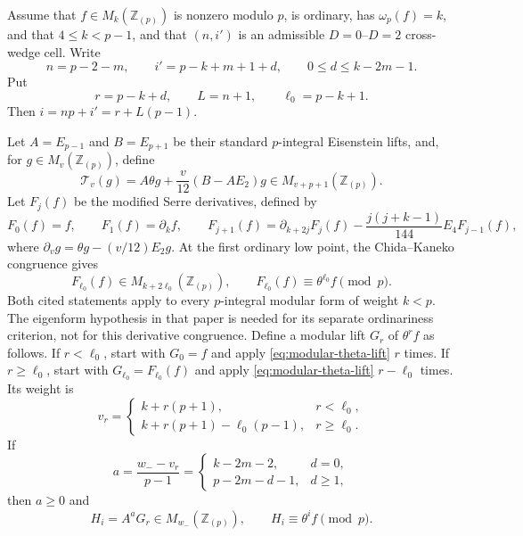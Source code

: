 \begin{theorem}
\label{thm:explicit-periodic-first-jet}
Assume that $f\in M_k(\mathbb Z_{(p)})$ is nonzero modulo $p$, is ordinary,
has $\omega_p(f)=k$, and that
$4\leq k<p-1$, and that $(n,i')$ is an admissible $D=0$--$D=2$
cross-wedge cell.  Write
\[
 n=p-2-m,
 \qquad
 i'=p-k+m+1+d,
 \qquad
 0\leq d\leq k-2m-1.
\]
Put
\[
 r=p-k+d,
 \qquad L=n+1,
 \qquad \ell_0=p-k+1.
\]
Then $i=np+i'=r+L(p-1)$.

Let $A=E_{p-1}$ and $B=E_{p+1}$ be their standard
$p$-integral Eisenstein lifts, and, for $g\in M_v(\mathbb Z_{(p)})$,
define
\begin{equation}\label{eq:modular-theta-lift}
 \mathcal T_v(g)
 =A\theta g+\frac{v}{12}(B-AE_2)g
 \in M_{v+p+1}(\mathbb Z_{(p)}).
\end{equation}
Let $F_j(f)$ be the modified Serre derivatives, defined by
\[
 F_0(f)=f,
 \qquad F_1(f)=\partial_k f,
 \qquad
 F_{j+1}(f)=\partial_{k+2j}F_j(f)
 -\frac{j(j+k-1)}{144}E_4F_{j-1}(f),
\]
where $\partial_v g=\theta g-(v/12)E_2g$.  At the first ordinary low
point, the Chida--Kaneko congruence
\cite[Lemma~2.4 and Proposition~2.5]{ChidaKaneko2007} gives
\[
 F_{\ell_0}(f)\in M_{k+2\ell_0}(\mathbb Z_{(p)}),
 \qquad
 F_{\ell_0}(f)\equiv\theta^{\ell_0}f\pmod p.
\]
Both cited statements apply to every $p$-integral modular form of weight
$k<p$.  The eigenform hypothesis in that paper is needed for its separate
ordinariness criterion, not for this derivative congruence.
Define a modular lift $G_r$ of $\theta^r f$ as follows.  If
$r<\ell_0$, start with $G_0=f$ and apply \eqref{eq:modular-theta-lift}
$r$ times.  If $r\geq\ell_0$, start with $G_{\ell_0}=F_{\ell_0}(f)$
and apply \eqref{eq:modular-theta-lift} $r-\ell_0$ times.  Its weight is
\[
 v_r=
 \begin{cases}
 k+r(p+1),&r<\ell_0,\\
 k+r(p+1)-\ell_0(p-1),&r\geq\ell_0.
 \end{cases}
\]
If
\[
 a=\frac{w_--v_r}{p-1}
 =\begin{cases}
 k-2m-2,&d=0,\\
 p-2m-d-1,&d\geq1,
 \end{cases}
\]
then $a\geq0$ and
\begin{equation}\label{eq:explicit-lower-weight-lift}
 H_i=A^aG_r\in M_{w_-}(\mathbb Z_{(p)}),
 \qquad H_i\equiv\theta^if\pmod p.
\end{equation}


\end{theorem}
